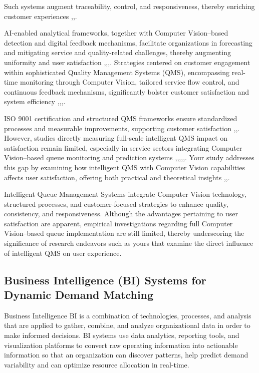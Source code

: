 \documentclass{research}
\begin{document}
Such systems augment traceability, control, and responsiveness, thereby enriching customer experiences \cite{ref16},\cite{ref17},\cite{ref18}.

AI-enabled analytical frameworks, together with Computer Vision–based detection and digital feedback mechanisms, facilitate organizations in forecasting and mitigating service and quality-related challenges, thereby augmenting uniformity and user satisfaction \cite{ref19},\cite{ref20},\cite{ref21},\cite{ref22}. Strategies centered on customer engagement within sophisticated Quality Management Systems (QMS), encompassing real-time monitoring through Computer Vision, tailored service flow control, and continuous feedback mechanisms, significantly bolster customer satisfaction and system efficiency \cite{ref23},\cite{ref24},\cite{ref25},\cite{ref26}.

ISO 9001 certification and structured QMS frameworks ensure standardized processes and measurable improvements, supporting customer satisfaction \cite{ref27},\cite{ref6},\cite{ref7}. However, studies directly measuring full-scale intelligent QMS impact on satisfaction remain limited, especially in service sectors integrating Computer Vision–based queue monitoring and prediction systems \cite{ref28},\cite{ref19},\cite{ref21},\cite{ref18},\cite{ref29},\cite{ref20}. Your study addresses this gap by examining how intelligent QMS with Computer Vision capabilities affects user satisfaction, offering both practical and theoretical insights \cite{ref6},\cite{ref9},\cite{ref3}.

Intelligent Queue Management Systems integrate Computer Vision technology, structured processes, and customer-focused strategies to enhance quality, consistency, and responsiveness. Although the advantages pertaining to user satisfaction are apparent, empirical investigations regarding full Computer Vision–based queue implementation are still limited, thereby underscoring the significance of research endeavors such as yours that examine the direct influence of intelligent QMS on user experience.

\subsection{Business Intelligence (BI) Systems for Dynamic Demand Matching}
Business Intelligence BI is a combination of technologies, processes, and analysis that are applied to gather, combine, and analyze organizational data in order to make informed decisions. BI systems use data analytics, reporting tools, and visualization platforms to convert raw operating information into actionable information so that an organization can discover patterns, help predict demand variability and can optimize resource allocation in real-time.
\end{document}
